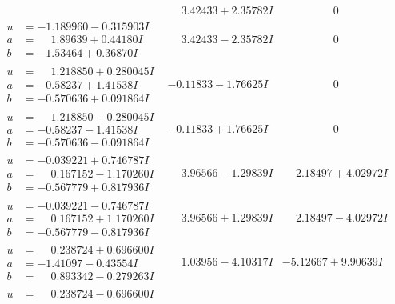 \documentclass[1p]{elsarticle_modified}
\theoremstyle{definition}
\begin{document}
$$\begin{array}{c|c|c}
 & \phantom{-}3.42433 + 2.35782 I & \phantom{-0.000000 } 0 \\ \hline\begin{aligned}
u &= -1.189960 - 0.315903 I \\
a &= \phantom{-}1.89639 + 0.44180 I \\
b &= -1.53464 + 0.36870 I\end{aligned}
 & \phantom{-}3.42433 - 2.35782 I & \phantom{-0.000000 } 0 \\ \hline\begin{aligned}
u &= \phantom{-}1.218850 + 0.280045 I \\
a &= -0.58237 + 1.41538 I \\
b &= -0.570636 + 0.091864 I\end{aligned}
 & -0.11833 - 1.76625 I & \phantom{-0.000000 } 0 \\ \hline\begin{aligned}
u &= \phantom{-}1.218850 - 0.280045 I \\
a &= -0.58237 - 1.41538 I \\
b &= -0.570636 - 0.091864 I\end{aligned}
 & -0.11833 + 1.76625 I & \phantom{-0.000000 } 0 \\ \hline\begin{aligned}
u &= -0.039221 + 0.746787 I \\
a &= \phantom{-}0.167152 - 1.170260 I \\
b &= -0.567779 + 0.817936 I\end{aligned}
 & \phantom{-}3.96566 - 1.29839 I & \phantom{-}2.18497 + 4.02972 I \\ \hline\begin{aligned}
u &= -0.039221 - 0.746787 I \\
a &= \phantom{-}0.167152 + 1.170260 I \\
b &= -0.567779 - 0.817936 I\end{aligned}
 & \phantom{-}3.96566 + 1.29839 I & \phantom{-}2.18497 - 4.02972 I \\ \hline\begin{aligned}
u &= \phantom{-}0.238724 + 0.696600 I \\
a &= -1.41097 - 0.43554 I \\
b &= \phantom{-}0.893342 - 0.279263 I\end{aligned}
 & \phantom{-}1.03956 - 4.10317 I & -5.12667 + 9.90639 I \\ \hline\begin{aligned}
u &= \phantom{-}0.238724 - 0.696600 I \\

\end{aligned}
\end{array}$$
\end{document}
